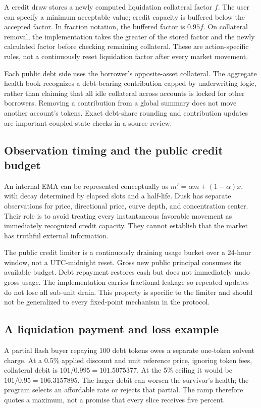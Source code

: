 A credit draw stores a newly computed liquidation collateral factor $f$. The user can specify a minimum acceptable value; credit capacity is buffered below the accepted factor. In fraction notation, the buffered factor is $0.95f$. On collateral removal, the implementation takes the greater of the stored factor and the newly calculated factor before checking remaining collateral. These are action-specific rules, not a continuously reset liquidation factor after every market movement.

Each public debt side uses the borrower's opposite-asset collateral. The aggregate health book recognizes a debt-bearing contribution capped by underwriting logic, rather than claiming that all idle collateral across accounts is locked for other borrowers. Removing a contribution from a global summary does not move another account's tokens. Exact debt-share rounding and contribution updates are important coupled-state checks in a source review.

\subsection{Observation timing and the public credit budget}

An internal EMA can be represented conceptually as $m'=\alpha m+(1-\alpha)x$, with decay determined by elapsed slots and a half-life. Dusk has separate observations for price, directional price, curve depth, and concentration center. Their role is to avoid treating every instantaneous favorable movement as immediately recognized credit capacity. They cannot establish that the market has truthful external information.

The public credit limiter is a continuously draining usage bucket over a 24-hour window, not a UTC-midnight reset. Gross new public principal consumes its available budget. Debt repayment restores cash but does not immediately undo gross usage. The implementation carries fractional leakage so repeated updates do not lose all sub-unit drain. This property is specific to the limiter and should not be generalized to every fixed-point mechanism in the protocol.

\subsection{A liquidation payment and loss example}

A partial flash buyer repaying 100 debt tokens owes a separate one-token solvent charge. At a 0.5\% applied discount and unit reference price, ignoring token fees, collateral debit is $101/0.995=101.5075377$. At the 5\% ceiling it would be $101/0.95=106.3157895$. The larger debit can worsen the survivor's health; the program selects an affordable rate or rejects that partial. The ramp therefore quotes a maximum, not a promise that every slice receives five percent.

